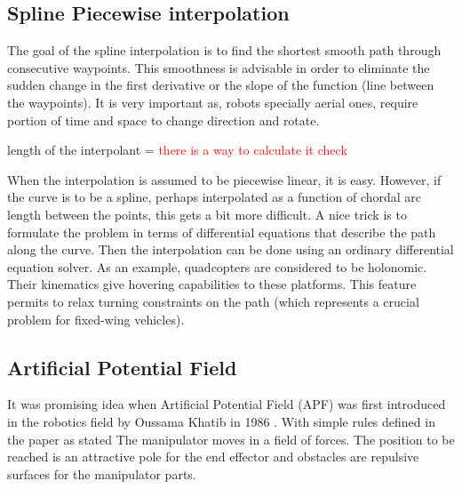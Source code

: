 \subsection{Spline Piecewise interpolation }





The goal of the spline interpolation is to find the shortest smooth path through  consecutive waypoints. This smoothness is advisable in order to eliminate the sudden change in the first derivative or the slope of the function (line between the waypoints). It is very important as, robots specially aerial ones, require portion of time and space to change direction and rotate.

length of the interpolant = \textcolor{red}{there is a way to calculate it check }

When the interpolation is assumed to be piecewise linear, it is easy. However, if the curve is to be a spline, perhaps interpolated as a function of chordal arc length between the points, this gets a bit more difficult. A nice trick is to formulate the problem in terms of differential equations that describe the path along the curve. Then the interpolation can be done using an ordinary differential equation solver. As an example, quadcopters are considered to be holonomic. Their kinematics give hovering capabilities to these platforms. This feature permits to relax turning constraints on the path (which represents a crucial problem for fixed-wing vehicles).

\subsection{Artificial Potential Field}
It was promising idea when Artificial Potential Field (APF) was first introduced in the robotics field by Oussama Khatib in 1986 \cite{khatib1986real}. With simple rules defined in the paper as stated The manipulator moves in a field of forces. The position to be reached is an attractive pole for the end effector and obstacles are repulsive surfaces for the manipulator parts.

